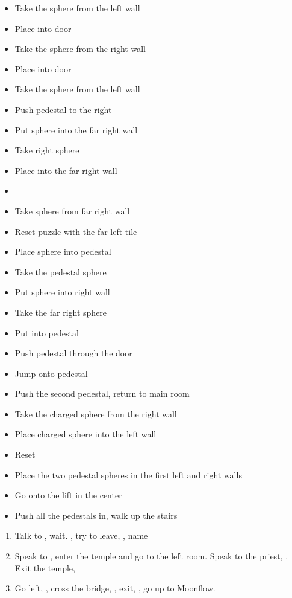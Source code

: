 \begin{trial}
    \begin{itemize}
        \item Take the sphere from the left wall
        \item Place into door
        \item Take the sphere from the right wall
        \item Place into door
        \item Take the sphere from the left wall
        \item Push pedestal to the right
        \item Put sphere into the far right wall
        \item Take right sphere
        \item Place into the far right wall
        \item \cs
        \item Take sphere from far right wall
        \item Reset puzzle with the far left tile
        \item Place sphere into pedestal
        \item Take the pedestal sphere
        \item Put sphere into right wall
        \item Take the far right sphere
        \item Put into pedestal
        \item Push pedestal through the door
        \item Jump onto pedestal
        \item Push the second pedestal, return to main room
        \item Take the charged sphere from the right wall
        \item Place charged sphere into the left wall
        \item Reset
        \item Place the two pedestal spheres in the first left and right walls
        \item Go onto the lift in the center
        \item Push all the pedestals in, walk up the stairs
    \end{itemize}
\end{trial}
\begin{enumerate}[resume]
    \item Talk to \auron, wait. \sd, try to leave, \sd, name \ixion
    \item Speak to \auron, enter the temple and go to the left room. Speak to the priest, \sd. Exit the temple, \sd
    \item Go left, , cross the bridge, \sd, exit, \sd, go up to Moonflow.
\end{enumerate}
\wincb\losscb\bothcb
